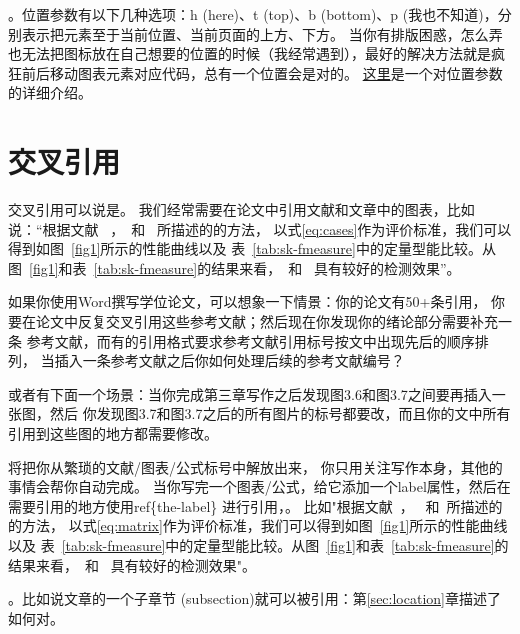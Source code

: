 \documentclass[UTF8]{ctexart}
\numberwithin{equation}{section} %
\numberwithin{table}{section} %
\begin{document}
。位置参数有以下几种选项：h (here)、t (top)、b (bottom)、p (我也不知道)，分别表示把元素至于当前位置、当前页面的上方、下方。
当你有排版困惑，怎么弄也无法把图标放在自己想要的位置的时候（我经常遇到），最好的解决方法就是疯狂前后移动图表元素对应代码，总有一个位置会是对的。
%
\href{https://tex.stackexchange.com/questions/35125/how-to-use-the-placement-options-t-h-with-figures}{这里}是一个对位置参数的详细介绍。

\section{交叉引用}\label{sec:ref}
交叉引用可以说是。
我们经常需要在论文中引用文献和文章中的图表，比如说：“根据文献
~\cite{shen2017label}，~\cite{shen2016object}和~\cite{shen2017deepskeleton}
所描述的的方法，
以式\ref{eq:cases}作为评价标准，我们可以得到如图~\ref{fig1}所示的性能曲线以及
表~\ref{tab:sk-fmeasure}中的定量型能比较。从图~\ref{fig1}和表~\ref{tab:sk-fmeasure}的结果来看，~\cite{shen2016object}和~\cite{shen2017deepskeleton}
具有较好的检测效果”。

如果你使用Word撰写学位论文，可以想象一下情景：你的论文有50+条引用，
你要在论文中反复交叉引用这些参考文献；然后现在你发现你的绪论部分需要补充一条
参考文献，而有的引用格式要求参考文献引用标号按文中出现先后的顺序排列，
当插入一条参考文献之后你如何处理后续的参考文献编号？


或者有下面一个场景：当你完成第三章写作之后发现图3.6和图3.7之间要再插入一张图，然后
你发现图3.7和图3.7之后的所有图片的标号都要改，而且你的文中所有引用到这些图的地方都需要修改。

\textbf{}将把你从繁琐的文献/图表/公式标号中解放出来，
你只用关注写作本身，其他的事情会帮你自动完成。
%
当你写完一个图表/公式，给它添加一个label属性，然后在需要引用的地方使用ref\{the-label\}
进行引用，。
%
比如"根据文献~\cite{shen2017label}，~\cite{shen2016object}
和~\cite{shen2017deepskeleton}所描述的的方法，
以式\ref{eq:matrix}作为评价标准，我们可以得到如图~\ref{fig1}所示的性能曲线以及
表~\ref{tab:sk-fmeasure}中的定量型能比较。从图~\ref{fig1}和表~\ref{tab:sk-fmeasure}的结果来看，~\cite{shen2016object}和~\cite{shen2017deepskeleton}
具有较好的检测效果"。

。比如说文章的一个子章节
(subsection)就可以被引用：第\ref{sec:location}章描述了如何对。
\end{document}
